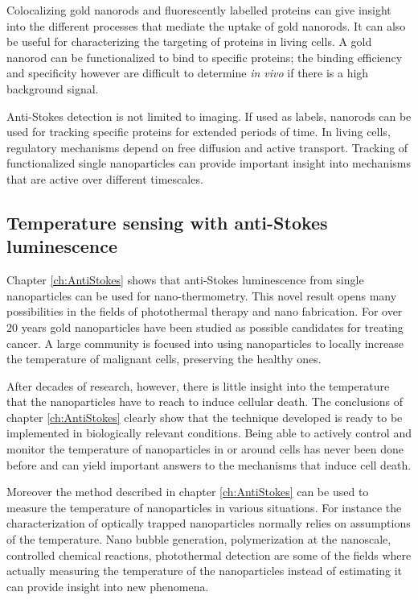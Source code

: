 Colocalizing gold nanorods and fluorescently labelled proteins can give insight
into the different processes that mediate the uptake of gold
nanorods\cite{Leduc2013}. It can also be useful for characterizing the targeting
of proteins in living cells. A gold nanorod can be functionalized to bind to
specific proteins\cite{Li2013a}; the binding efficiency and specificity however
are difficult to determine \textit{in vivo} if there is a high background
signal.

Anti-Stokes detection is not limited to imaging. If used as labels, nanorods can
be used for tracking\cite{Spillane2014} specific proteins for extended periods
of time. In living cells, regulatory mechanisms depend on free diffusion and
active transport\cite{Nowack2012}. Tracking of functionalized single
nanoparticles can provide important insight into mechanisms that are active over
different timescales\cite{Conde2013}.

\subsection{Temperature sensing with anti-Stokes luminescence}
Chapter \ref{ch:AntiStokes} shows that anti-Stokes luminescence from single
nanoparticles can be used for nano-thermometry. This novel result opens many
possibilities in the fields of photothermal therapy\cite{Hirsch2003} and nano
fabrication\cite{Fedoruk2013}. For over $20$ years gold nanoparticles have been
studied as possible candidates for treating cancer\cite{ONeal2004}. A large
community is focused into using nanoparticles to locally increase the temperature of malignant cells,
preserving the healthy ones.

After decades of research, however, there is little insight into the temperature
that the nanoparticles have to reach to induce cellular death\cite{Huang2006a}.
The conclusions of chapter \ref{ch:AntiStokes} clearly show that the technique
developed is ready to be implemented in biologically relevant conditions. Being
able to actively control and monitor the temperature of nanoparticles in or
around cells has never been done before and can yield important answers to the
mechanisms that induce cell death.

Moreover the method described in chapter \ref{ch:AntiStokes} can be used to
measure the temperature of nanoparticles in various situations. For instance the
characterization of optically trapped nanoparticles normally relies on
assumptions of the temperature\cite{Ruijgrok2011a}. Nano bubble
generation\cite{Hou2015}, polymerization at the nanoscale\cite{Ma2014a},
controlled chemical reactions\cite{Urban2009}, photothermal
detection\cite{Boyer2002} are some of the fields where actually measuring the
temperature of the nanoparticles instead of estimating it can provide insight
into new phenomena.

